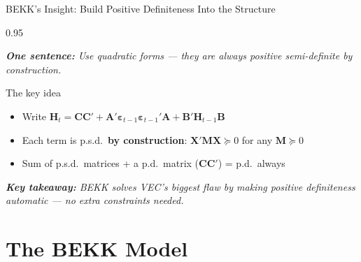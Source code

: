 \documentclass[9pt, aspectratio=169, t]{beamer}
\begin{document}
\begin{frame}{BEKK's Insight: Build Positive Definiteness Into the Structure}
    \begin{cminipage}{0.95\textwidth}
    {\footnotesize
    \textit{\textbf{One sentence:} Use quadratic forms --- they are always positive semi-definite by construction.}
    \vspace{0.2cm}
    \begin{exampleblock}{The key idea}
        \begin{itemize}\setlength{\itemsep}{3pt}
            \item Write $\mathbf{H}_t = \mathbf{C}\mathbf{C}' + \mathbf{A}'\boldsymbol{\varepsilon}_{t-1}\boldsymbol{\varepsilon}_{t-1}'\mathbf{A} + \mathbf{B}'\mathbf{H}_{t-1}\mathbf{B}$
            \item Each term is p.s.d.\ \textbf{by construction}: $\mathbf{X}'\mathbf{M}\mathbf{X} \succeq 0$ for any $\mathbf{M} \succeq 0$
            \item Sum of p.s.d.\ matrices + a p.d.\ matrix ($\mathbf{C}\mathbf{C}'$) = p.d.\ always
        \end{itemize}
    \end{exampleblock}
    \vspace{0.2cm}
    \textit{\textbf{Key takeaway:} BEKK solves VEC's biggest flaw by making positive definiteness automatic --- no extra constraints needed.}
    }
    \end{cminipage}
\end{frame}

\section{The BEKK Model}
\end{document}

